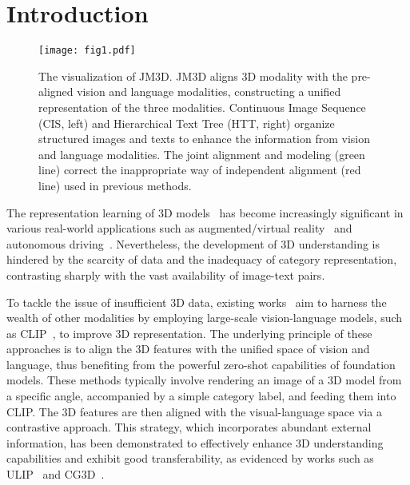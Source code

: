 \documentclass[sigconf]{acmart}
\begin{document}

\renewcommand{\shortauthors}{Haowei Wang, et al.}





\maketitle

\section{Introduction \label{sec:Introduction}}

\begin{figure}[t]
\centering
\texttt{[image: fig1.pdf]}

\caption{The visualization of JM3D. JM3D aligns 3D modality with the pre-aligned vision and language modalities, constructing a unified representation of the three modalities. Continuous Image Sequence (CIS, left) and Hierarchical Text Tree (HTT, right) organize structured images and texts to enhance the information from vision and language modalities. The joint alignment and modeling {\color{green}(green line)} correct the inappropriate way of independent alignment {\color{red}(red line)} used in previous methods.}
\label{fig1}
\end{figure}



The representation learning of 3D models~\cite{achlioptas2018learning, liu2019densepoint, liu2020closer, ran2022surface, xie2020grnet, xu2021paconv} has become increasingly significant in various real-world applications such as augmented/virtual reality~\cite{liu2021group, vu2022softgroup, armeni20163d} and autonomous driving~\cite{li2022deepfusion, yin2021center}. Nevertheless, the development of 3D understanding is hindered by the scarcity of data and the inadequacy of category representation, contrasting sharply with the vast availability of image-text pairs.

To tackle the issue of insufficient 3D data, existing works~\cite{hegde2023clip, xue2022ulip, zhang2023clip} aim to harness the wealth of other modalities by employing large-scale vision-language models, such as CLIP~\cite{radford2021learning}, to improve 3D representation. The underlying principle of these approaches is to align the 3D features with the unified space of vision and language, thus benefiting from the powerful zero-shot capabilities of foundation models. These methods typically involve rendering an image of a 3D model from a specific angle, accompanied by a simple category label, and feeding them into CLIP. The 3D features are then aligned with the visual-language space via a contrastive approach. This strategy, which incorporates abundant external information, has been demonstrated to effectively enhance 3D understanding capabilities and exhibit good transferability, as evidenced by works such as ULIP~\cite{xue2022ulip} and CG3D~\cite{hegde2023clip}.
\end{document}
